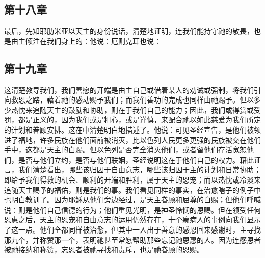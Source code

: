 
\subsection{第十八章}

\par

最后，先知耶肋米亚以天主的身份说话，清楚地证明，连我们能持守祂的敬畏，也是由主倾注在我们身上的：他说：厄则克耳也说：\par


\subsection{第十九章}

\par

这清楚教导我们，我们善愿的开端是由主自己或借着某人的劝诫或强制，将我们引向救恩之路，藉着祂的感动赐予我们；而我们善功的完成也同样由祂赐予。但以多少热忱来追随天主的鼓励和协助，则在于我们自己的能力；因此，我们或得赏或受罚，都是正义的，因为我们或是粗心，或是谨慎，来配合祂以如此慈爱为我们所定的计划和眷顾安排。这在中清楚明白地描述了。他说：可见圣经宣告，是他们被领进了福地，许多民族在他们面前被消灭，比以色列人民更多更强的民族被交在他们手中，这都是天主的白赐。但以色列是否完全消灭他们，或者留他们存活宽恕他们，是否与他们立约，是否与他们联姻，圣经说明这在于他们自己的权力。藉此证言，我们清楚看出，哪些该归因于自由意志，哪些该归因于主的计划和日常协助；即给予我们得救的机会、顺利的开端和胜利，属于天主的恩宠；而以热忱或冷淡来追随天主赐予的福佑，则是我们的事。我们看见同样的事实，在治愈瞎子的例子中也明白教训了。因为耶稣从他们旁边经过，是天主眷顾和屈尊的白赐；但他们呼喊说：则是他们自己信德的行为；他们重见光明，是神圣怜悯的恩赐。但在领受任何恩惠之后，天主的恩宠和自由意志的运用仍然存在，十个癞病人的事例向我们显示了这一点。他们全都同样被治愈，但其中一人出于善意的感恩回来感谢时，主寻找那九个，并称赞那一个，表明祂甚至常愿帮助那些忘记祂恩惠的人。因为连感恩者被祂接纳和称赞，忘恩者被祂寻找和责斥，也是祂眷顾的恩赐。\par

